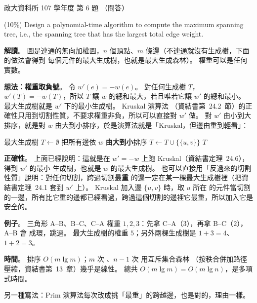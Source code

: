 \begin{pastexam}[label={px:nccu-107-dsa-06}]{政大資科所 107 學年度 第 6 題}
（問答）

(10\%) Design a polynomial-time algorithm to compute the maximum spanning tree, i.e., the spanning
tree that has the largest total edge weight.
\end{pastexam}

\begin{pastsoln}
\textbf{解讀}。 圖是連通的無向加權圖，$n$ 個頂點、$m$ 條邊（不連通就沒有生成樹，下面的做法會得到
每個元件的最大生成樹，也就是最大生成森林）。 權重可以是任何實數。

\textbf{想法：權重取負號}。 令 $w'(e) = -w(e)$。 對任何生成樹 $T$，$w'(T) = -w(T)$，所以 $T$ 讓 $w$
的總和最大，若且唯若它讓 $w'$ 的總和最小。 最大生成樹就是 $w'$ 下的最小生成樹。 Kruskal 演算法
（資結書第~24.2~節）的正確性只用到切割性質，不要求權重非負，所以可以直接對 $w'$ 做。 對 $w'$ 由小到大
排序，就是對 $w$ 由大到小排序，於是演算法就是「Kruskal，但邊由重到輕看」：
\begin{pseudo}[unbreakable]{最大生成樹}
    \State $T \gets \emptyset$
        \State {}
    \EndFor
    \State 把所有邊依 $w$ \textbf{由大到小}排序
         
            \State $T \gets T \cup \{\{u, v\}\}$
            \State {}
        \EndIf
    \EndFor
    \State \Return $T$
\EndFunction
\end{pseudo}

\textbf{正確性}。 上面已經說明：這就是在 $w' = -w$ 上跑 Kruskal（資結書定理~24.6），得到 $w'$ 的最小
生成樹，也就是 $w$ 的最大生成樹。 也可以直接用「反過來的切割性質」說明：對任何切割，跨過切割最\textbf{重}
的邊一定在某一棵最大生成樹裡（把資結書定理~24.1 套到 $w'$ 上）。 Kruskal 加入邊 $\{u, v\}$ 時，取 $u$ 所在
的元件當切割的一邊，所有比它重的邊都已經看過，跨過這個切割的邊裡它最重，所以加入它是安全的。

\textbf{例子}。 三角形 A--B、B--C、C--A 權重 $1, 2, 3$：先拿 C--A（$3$），再拿 B--C（$2$），A--B 會
成環，跳過。 最大生成樹的權重 $5$；另外兩棵生成樹是 $1 + 3 = 4$、$1 + 2 = 3$。

\textbf{時間}。 排序 $O(m \lg m)$；$m$ 次 、$n - 1$ 次  用互斥集合森林
（按秩合併加路徑壓縮，資結書第~13~章）幾乎是線性。 總共 $O(m \lg m) = O(m \lg n)$，是多項式時間。

另一種寫法：Prim 演算法每次改成挑「最重」的跨越邊，也是對的，理由一樣。
\end{pastsoln}
